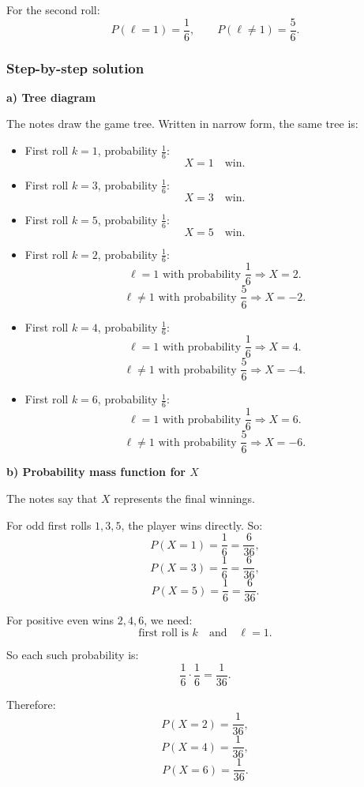 \documentclass[10pt]{article}
\begin{document}
For the second roll:
\[
P(\ell=1)=\frac{1}{6},
\qquad
P(\ell\ne 1)=\frac{5}{6}.
\]

\subsubsection*{Step-by-step solution}

\textbf{a) Tree diagram}

The notes draw the game tree. Written in narrow form,
the same tree is:

\begin{itemize}
\item
First roll \(k=1\), probability \(\frac16\):
\[
X=1
\quad\text{win}.
\]

\item
First roll \(k=3\), probability \(\frac16\):
\[
X=3
\quad\text{win}.
\]

\item
First roll \(k=5\), probability \(\frac16\):
\[
X=5
\quad\text{win}.
\]

\item
First roll \(k=2\), probability \(\frac16\):
\[
\ell=1
\text{ with probability }\frac16
\Rightarrow X=2.
\]
\[
\ell\ne 1
\text{ with probability }\frac56
\Rightarrow X=-2.
\]

\item
First roll \(k=4\), probability \(\frac16\):
\[
\ell=1
\text{ with probability }\frac16
\Rightarrow X=4.
\]
\[
\ell\ne 1
\text{ with probability }\frac56
\Rightarrow X=-4.
\]

\item
First roll \(k=6\), probability \(\frac16\):
\[
\ell=1
\text{ with probability }\frac16
\Rightarrow X=6.
\]
\[
\ell\ne 1
\text{ with probability }\frac56
\Rightarrow X=-6.
\]
\end{itemize}

\textbf{b) Probability mass function for \(X\)}

The notes say that \(X\) represents the final
winnings.

For odd first rolls \(1,3,5\), the player wins
directly. So:
\[
P(X=1)=\frac16=\frac{6}{36},
\]
\[
P(X=3)=\frac16=\frac{6}{36},
\]
\[
P(X=5)=\frac16=\frac{6}{36}.
\]

For positive even wins \(2,4,6\), we need:
\[
\text{first roll is }k
\quad\text{and}\quad
\ell=1.
\]

So each such probability is:
\[
\frac16\cdot\frac16=\frac{1}{36}.
\]

Therefore:
\[
P(X=2)=\frac{1}{36},
\]
\[
P(X=4)=\frac{1}{36},
\]
\[
P(X=6)=\frac{1}{36}.
\]
\end{document}
